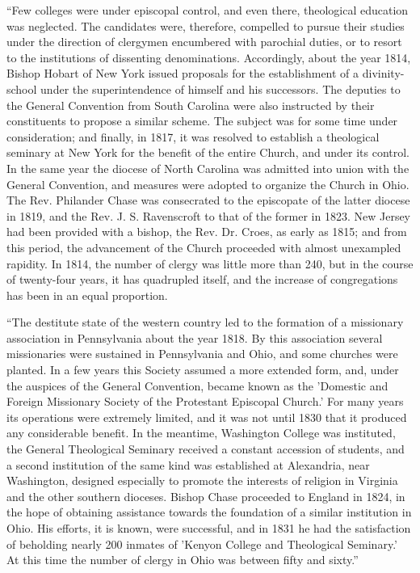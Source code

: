 ``Few
colleges were under episcopal control, and even there, theological
education was neglected. The candidates were, therefore, compelled to
pursue their studies under the direction of clergymen encumbered with
parochial duties, or to resort to the institutions of dissenting
denominations. Accordingly, about the year 1814, Bishop Hobart of New
York issued proposals for the establishment of a divinity-school under
the superintendence of himself and his successors. The deputies to the
General Convention from South Carolina were also instructed by their
constituents to propose a similar scheme. The subject was for some
time under consideration; and finally, in 1817, it was resolved to
establish a theological seminary at New York for the benefit of the
entire Church, and under its control. In the same year the diocese of
North Carolina was admitted into union with the General Convention,
and measures were adopted to organize the Church in Ohio. The Rev.
Philander Chase was consecrated to the episcopate of the latter
diocese in 1819, and the Rev. J. S. Ravenscroft to that of the former
in 1823. New Jersey had
been provided with a bishop, the Rev. Dr. Croes, as early as 1815; and
from this period, the advancement of the Church proceeded with almost
unexampled rapidity. In 1814, the number of clergy was little more
than 240, but in the course of twenty-four years, it has quadrupled
itself, and the increase of congregations has been in an equal
proportion.

``The
destitute state of the western country led to the formation of a
missionary association in Pennsylvania about the year 1818. By this
association several missionaries were sustained in Pennsylvania and
Ohio, and some churches were planted. In a few years this Society
assumed a more extended form, and, under the auspices of the General
Convention, became known as the 'Domestic and Foreign Missionary
Society of the Protestant Episcopal Church.' For many years its
operations were extremely limited, and it was not until 1830 that it
produced any considerable benefit. In the meantime, Washington College
was instituted, the General Theological Seminary received a constant
accession of students, and a second institution of the same kind was
established at Alexandria, near Washington, designed especially to
promote the interests of religion in Virginia and the other southern
dioceses. Bishop Chase proceeded to England in 1824, in the hope of
obtaining assistance towards the foundation of a similar institution
in Ohio. His efforts, it is known, were successful, and in 1831 he had
the satisfaction of beholding nearly 200 inmates of 'Kenyon College
and Theological Seminary.' At this time the number of clergy in Ohio
was between fifty and sixty.''

